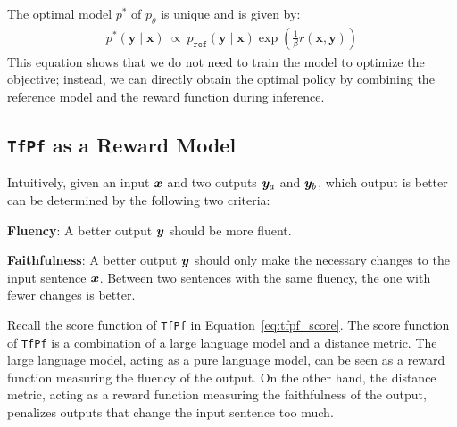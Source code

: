 The optimal model $p^*$ of $p_{\theta}$ is unique and is given by:
\begin{equation}
    \begin{aligned}
        p^*(\boldsymbol{y}\mid \boldsymbol{x})\ \propto\ p_{\mathtt{ref}}(\boldsymbol{y}\mid \boldsymbol{x}) \exp\left(\frac{1}{\beta} r(\boldsymbol{x}, \boldsymbol{y})\right)%
    \end{aligned}%
    \label{eq:optimal_policy}
\end{equation}
This equation shows that we do not need to train the model to optimize the objective; instead, we can directly obtain the optimal policy by combining the reference model and the reward function during inference.

\subsection{\texttt{TfPf} as a Reward Model}
\label{subsec:tfpf_as_a_reward_model}
Intuitively, given an input ${\boldsymbol{x}}$ and two outputs ${\boldsymbol{y}}_{a}$ and ${\boldsymbol{y}}_{b}$, which output is better can be determined by the following two criteria:
\begin{asparaitem}[$\bullet$]
    \item \textbf{Fluency}: A better output ${\boldsymbol{y}}$ should be more fluent.
    \item \textbf{Faithfulness}: A better output ${\boldsymbol{y}}$ should only make the necessary changes to the input sentence ${\boldsymbol{x}}$. Between two sentences with the same fluency, the one with fewer changes is better.
\end{asparaitem}

Recall the score function of \texttt{TfPf} in Equation~\ref{eq:tfpf_score}.
The score function of \texttt{TfPf} is a combination of a large language model and a distance metric.
The large language model, acting as a pure language model, can be seen as a reward function measuring the fluency of the output.
On the other hand, the distance metric, acting as a reward function measuring the faithfulness of the output, penalizes outputs that change the input sentence too much.

